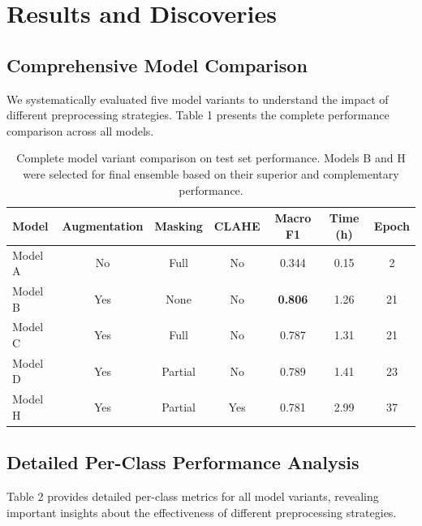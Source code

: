 \documentclass[12pt]{article}
\begin{document}
\section{Results and Discoveries}

\subsection{Comprehensive Model Comparison}

We systematically evaluated five model variants to understand the impact of different preprocessing strategies. Table 1 presents the complete performance comparison across all models.

\begin{table}[!h]
\centering
\small
\begin{tabular}{lcccccc}
\toprule
\textbf{Model} & \textbf{Augmentation} & \textbf{Masking} & \textbf{CLAHE} & \textbf{Macro F1} & \textbf{Time (h)} & \textbf{Epoch} \\
\midrule
Model A & No & Full & No & 0.344 & 0.15 & 2 \\
Model B & Yes & None & No & \textbf{0.806} & 1.26 & 21 \\
Model C & Yes & Full & No & 0.787 & 1.31 & 21 \\
Model D & Yes & Partial & No & 0.789 & 1.41 & 23 \\
Model H & Yes & Partial & Yes & 0.781 & 2.99 & 37 \\
\bottomrule
\end{tabular}
\caption{Complete model variant comparison on test set performance. Models B and H were selected for final ensemble based on their superior and complementary performance.}
\end{table}

\subsection{Detailed Per-Class Performance Analysis}

Table 2 provides detailed per-class metrics for all model variants, revealing important insights about the effectiveness of different preprocessing strategies.
\end{document}
